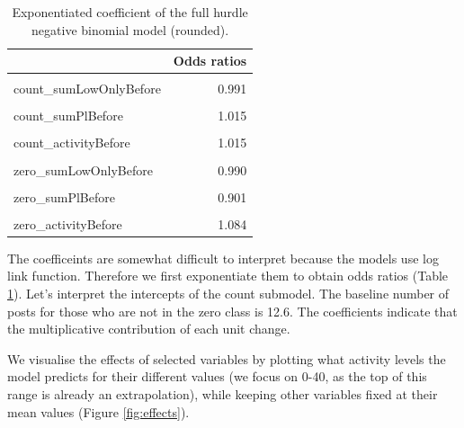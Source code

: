 \documentclass[
  10pt,
  dvipsnames]{scrartcl}
\begin{document}
\begin{table}[H]

\begin{table}[H]
\centering\begingroup\fontsize{9}{11}\selectfont

\begin{tabular}{lr}
\toprule
  & Odds ratios\\
\midrule
\cellcolor{gray!6}{count\_(Intercept)} & \cellcolor{gray!6}{12.606}\\
count\_sumLowOnlyBefore & 0.991\\
\cellcolor{gray!6}{count\_sumHighBefore} & \cellcolor{gray!6}{0.992}\\
count\_sumPlBefore & 1.015\\
\cellcolor{gray!6}{count\_sumPhBefore} & \cellcolor{gray!6}{0.870}\\
\addlinespace
count\_activityBefore & 1.015\\
\cellcolor{gray!6}{zero\_(Intercept)} & \cellcolor{gray!6}{1.634}\\
zero\_sumLowOnlyBefore & 0.990\\
\cellcolor{gray!6}{zero\_sumHighBefore} & \cellcolor{gray!6}{0.894}\\
zero\_sumPlBefore & 0.901\\
\addlinespace
\cellcolor{gray!6}{zero\_sumPhBefore} & \cellcolor{gray!6}{1.156}\\
zero\_activityBefore & 1.084\\
\bottomrule
\end{tabular}
\endgroup{}
\end{table}
\caption{Exponentiated coefficient of the full hurdle negative binomial model (rounded).}
\label{tab:exphnb}
\end{table}

The coefficeints are somewhat difficult to interpret because the models
use log link function. Therefore we first exponentiate them to obtain
odds ratios (Table \ref{tab:exphnb}). Let's interpret the intercepts of
the count submodel. The baseline number of posts for those who are not
in the zero class is 12.6. The coefficients indicate that the
multiplicative contribution of each unit change.

We visualise the effects of selected variables by plotting what activity
levels the model predicts for their different values (we focus on 0-40,
as the top of this range is already an extrapolation), while keeping
other variables fixed at their mean values (Figure \ref{fig:effects}).

\footnotesize
\end{document}
